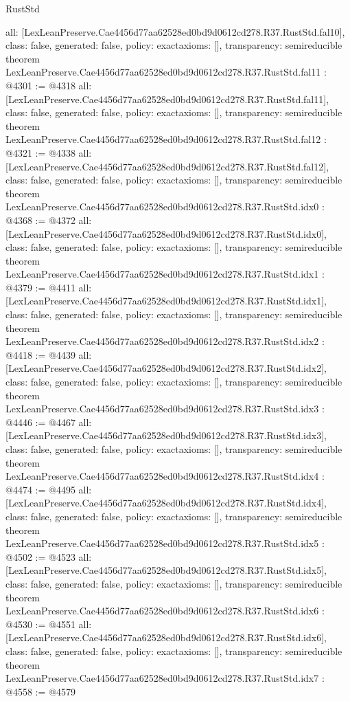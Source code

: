 \begin{lexlean}{RustStd}
\begin{coremodule}
{  all: [LexLeanPreserve.Cae4456d77aa62528ed0bd9d0612cd278.R37.RustStd.fal10],
  class: false,
  generated: false,
  policy: exact{axioms: []},
  transparency: semireducible
}
theorem LexLeanPreserve.Cae4456d77aa62528ed0bd9d0612cd278.R37.RustStd.fal11 : @4301 := @4318 {
  all: [LexLeanPreserve.Cae4456d77aa62528ed0bd9d0612cd278.R37.RustStd.fal11],
  class: false,
  generated: false,
  policy: exact{axioms: []},
  transparency: semireducible
}
theorem LexLeanPreserve.Cae4456d77aa62528ed0bd9d0612cd278.R37.RustStd.fal12 : @4321 := @4338 {
  all: [LexLeanPreserve.Cae4456d77aa62528ed0bd9d0612cd278.R37.RustStd.fal12],
  class: false,
  generated: false,
  policy: exact{axioms: []},
  transparency: semireducible
}
theorem LexLeanPreserve.Cae4456d77aa62528ed0bd9d0612cd278.R37.RustStd.idx0 : @4368 := @4372 {
  all: [LexLeanPreserve.Cae4456d77aa62528ed0bd9d0612cd278.R37.RustStd.idx0],
  class: false,
  generated: false,
  policy: exact{axioms: []},
  transparency: semireducible
}
theorem LexLeanPreserve.Cae4456d77aa62528ed0bd9d0612cd278.R37.RustStd.idx1 : @4379 := @4411 {
  all: [LexLeanPreserve.Cae4456d77aa62528ed0bd9d0612cd278.R37.RustStd.idx1],
  class: false,
  generated: false,
  policy: exact{axioms: []},
  transparency: semireducible
}
theorem LexLeanPreserve.Cae4456d77aa62528ed0bd9d0612cd278.R37.RustStd.idx2 : @4418 := @4439 {
  all: [LexLeanPreserve.Cae4456d77aa62528ed0bd9d0612cd278.R37.RustStd.idx2],
  class: false,
  generated: false,
  policy: exact{axioms: []},
  transparency: semireducible
}
theorem LexLeanPreserve.Cae4456d77aa62528ed0bd9d0612cd278.R37.RustStd.idx3 : @4446 := @4467 {
  all: [LexLeanPreserve.Cae4456d77aa62528ed0bd9d0612cd278.R37.RustStd.idx3],
  class: false,
  generated: false,
  policy: exact{axioms: []},
  transparency: semireducible
}
theorem LexLeanPreserve.Cae4456d77aa62528ed0bd9d0612cd278.R37.RustStd.idx4 : @4474 := @4495 {
  all: [LexLeanPreserve.Cae4456d77aa62528ed0bd9d0612cd278.R37.RustStd.idx4],
  class: false,
  generated: false,
  policy: exact{axioms: []},
  transparency: semireducible
}
theorem LexLeanPreserve.Cae4456d77aa62528ed0bd9d0612cd278.R37.RustStd.idx5 : @4502 := @4523 {
  all: [LexLeanPreserve.Cae4456d77aa62528ed0bd9d0612cd278.R37.RustStd.idx5],
  class: false,
  generated: false,
  policy: exact{axioms: []},
  transparency: semireducible
}
theorem LexLeanPreserve.Cae4456d77aa62528ed0bd9d0612cd278.R37.RustStd.idx6 : @4530 := @4551 {
  all: [LexLeanPreserve.Cae4456d77aa62528ed0bd9d0612cd278.R37.RustStd.idx6],
  class: false,
  generated: false,
  policy: exact{axioms: []},
  transparency: semireducible
}
theorem LexLeanPreserve.Cae4456d77aa62528ed0bd9d0612cd278.R37.RustStd.idx7 : @4558 := @4579 {
}
\end{coremodule}
\end{lexlean}
